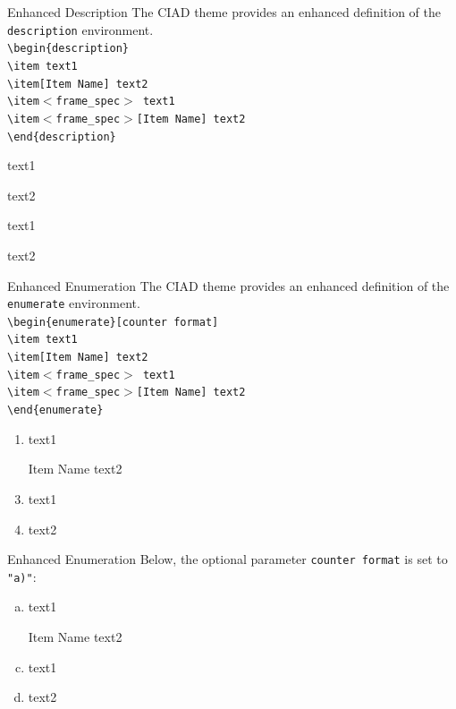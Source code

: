 \documentclass[english,sectioncirclenumberstyle]{ciadbeamer}
\begin{document}
\begin{frame}{Enhanced Description}
	The CIAD theme provides an enhanced definition of the \texttt{description} environment. \\[.5cm]
	{\smaller
	\texttt{{\textbackslash}begin\{description\}} \\
	\texttt{{\textbackslash}item text1} \\
	\texttt{{\textbackslash}item[Item Name] text2} \\
	\texttt{{\textbackslash}item$<$frame\_spec$>$ text1} \\
	\texttt{{\textbackslash}item$<$frame\_spec$>$[Item Name] text2} \\
	\texttt{{\textbackslash}end\{description\}}} \\[.5cm]
	\begin{description}
	\item text1
	\item[Item Name] text2
	\item<2> text1
	\item<2>[Item Name] text2
	\end{description}
\end{frame}

\begin{frame}{Enhanced Enumeration}
	The CIAD theme provides an enhanced definition of the \texttt{enumerate} environment. \\[.5cm]
	{\smaller
	\texttt{{\textbackslash}begin\{enumerate\}[counter format]} \\
	\texttt{{\textbackslash}item text1} \\
	\texttt{{\textbackslash}item[Item Name] text2} \\
	\texttt{{\textbackslash}item$<$frame\_spec$>$ text1} \\
	\texttt{{\textbackslash}item$<$frame\_spec$>$[Item Name] text2} \\
	\texttt{{\textbackslash}end\{enumerate\}}} \\[.5cm]
	\begin{enumerate}
	\item text1
	\item[Item Name] text2
	\item<2> text1
	\item<2>[Item Name] text2
	\end{enumerate}
\end{frame}

\begin{frame}{Enhanced Enumeration \insertcontinuationtext}
	Below, the optional parameter \texttt{counter format} is set to \texttt{"a)"}: \\[.5cm]
	\begin{enumerate}[a)]
	\item text1
	\item[Item Name] text2
	\item<2> text1
	\item<2>[Item Name] text2
	\end{enumerate}
\end{frame}
\end{document}
